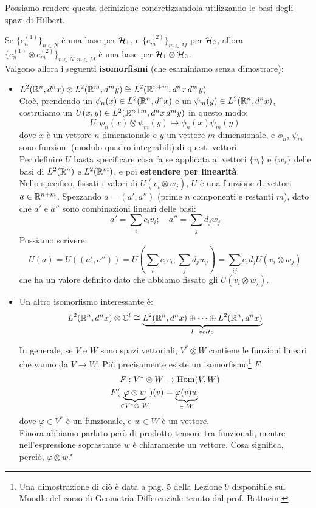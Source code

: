 \documentclass[../../FisicaTeorica.tex]{subfiles}
\begin{document}
Possiamo rendere questa definizione  concretizzandola utilizzando le basi degli spazi di Hilbert.
\begin{thm}
Se $\{e_n^{(1)}\}_{n\in N}$ è una base per $\mathcal{H}_1$, e $\{e_m^{(2)}\}_{m\in M}$ per $\mathcal{H}_2$, allora $\{e_n^{(1)}\otimes e_m^{(2)}\}_{n\in N, m\in M}$ è una base per $\mathcal{H}_1 \otimes \mathcal{H}_2$.\\
Valgono allora i seguenti \textbf{isomorfismi} (che esaminiamo senza dimostrare):
\begin{itemize}
\item 
$\displaystyle
L^2(\mathbb{R}^n, d^nx) \otimes L^2(\mathbb{R}^m,d^my) \cong L^2(\mathbb{R}^{n+m}, d^n x\,d^m y)
$\\
Cioè, prendendo un $\phi_n(x)\in L^2(\mathbb{R}^n,d^n x)$ e un $\psi_m(y) \in L^2(\mathbb{R}^n, d^n x)$, costruiamo un $U(x,y) \in L^2(\mathbb{R}^{n+m}, d^nx\, d^my)$ in questo modo:
\[
U: \phi_n(x) \otimes \psi_m(y) \mapsto \phi_n(x)\psi_m(y)
\]
dove $x$ è un vettore $n$-dimensionale e $y$ un vettore $m$-dimensionale, e $\phi_n$, $\psi_m$ sono funzioni (modulo quadro integrabili) di questi vettori.\\
Per definire $U$ basta specificare cosa fa se applicata ai vettori $\{v_i\}$ e $\{w_i\}$ delle basi di $L^2(\mathbb{R}^n)$ e $L^2(\mathbb{R}^m)$, e poi \textbf{estendere per linearità}.\\
Nello specifico, fissati i valori di $U(v_i \otimes w_j)$, $U$ è una funzione di vettori $a \in \mathbb{R}^{n+m}$. Spezzando $a = (a', a'')$ (prime $n$ componenti e restanti $m$), dato che $a'$ e $a''$ sono combinazioni lineari delle basi:
\[
a' = \sum_i c_i v_i; \quad a'' = \sum_j d_j w_j
\]
Possiamo scrivere:
\[
U(a)=U((a',a''))= U\left(\sum_{i} c_i v_i, \sum_j d_j w_j\right)= \sum_{ij} c_i d_j U(v_i \otimes w_j)
\]
che ha un valore definito dato che abbiamo fissato gli $U(v_i \otimes w_j)$.
\item Un altro isomorfismo interessante è:
\begin{align}
L^2(\mathbb{R}^n, d^nx) \otimes \mathbb{C}^l \cong \underbrace{L^2(\mathbb{R}^n, d^n x) \oplus \dots \oplus L^2(\mathbb{R}^n, d^nx)}_{l-volte}
\label{eqn:isomorfismo-prodotto-tensore}
\end{align}
\begin{expl}
In generale, se $V$ e $W$ sono spazi vettoriali, $V^* \otimes W$ contiene le funzioni lineari che vanno da $V\to W$. Più precisamente esiste un isomorfismo\footnote{Una dimostrazione di ciò è data a pag. 5 della Lezione 9 disponibile sul Moodle del corso di Geometria Differenziale tenuto dal prof. Bottacin.} $F$:
\begin{align*}
F: V^* \otimes W & \to \operatorname{Hom}(V,W)\\
F(\underbrace{\varphi \otimes w}_{\in V^* \otimes\ W})(v) &= \underbrace{\varphi(v)w}_{\in\ W}
\end{align*}
dove $\varphi \in V^*$ è un funzionale, e $w\in W$ è un vettore.\\
Finora abbiamo parlato però di prodotto tensore tra funzionali, mentre nell'espressione soprastante $w$ è chiaramente un vettore. Cosa significa, perciò, $\varphi\otimes w$?


\end{expl}
\end{itemize}
\end{thm}
\end{document}
